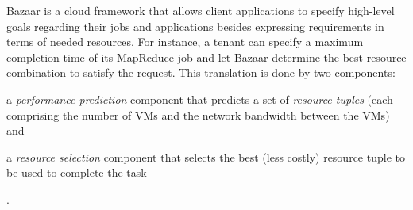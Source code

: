 Bazaar \cite{bazaar} is a cloud framework that allows client applications to specify high-level goals regarding their jobs and applications besides expressing requirements in terms of needed resources. For instance, a tenant can specify a maximum completion time of its MapReduce \cite{mapreduce} job and let Bazaar \cite{bazaar} determine the best resource combination to satisfy the request. This translation is done by two components:
\begin{mylist}
    \item a \textit{performance prediction} component that predicts a set of \textit{resource tuples} (each comprising the number of VMs and the network bandwidth between the VMs) and
    \item a \textit{resource selection} component that selects the best (less costly) resource tuple to be used to complete the task
\end{mylist}.